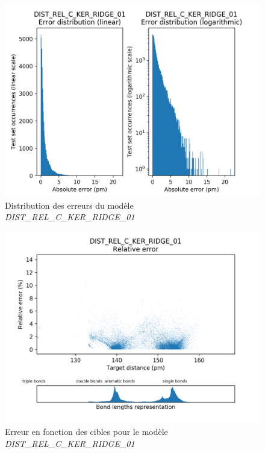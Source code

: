 \begin{figure}[!h]
	\centering
	
	\includegraphics[scale=0.8]{../figures/DIST_REL_C_KER_RIDGE_01/DIST_REL_C_KER_RIDGE_01_distrib_rmse_val.png}	
	
	\caption{Distribution des erreurs du modèle \emph{DIST\_REL\_C\_KER\_RIDGE\_01}}
\end{figure}
\begin{figure}[!h]
	\centering
	
	\includegraphics[scale=0.8]{../figures/DIST_REL_C_KER_RIDGE_01/DIST_REL_C_KER_RIDGE_01_distrib_rmse_dist.png}	
	
	\caption{Erreur en fonction des cibles pour le modèle \emph{DIST\_REL\_C\_KER\_RIDGE\_01}}
	\end{figure}

